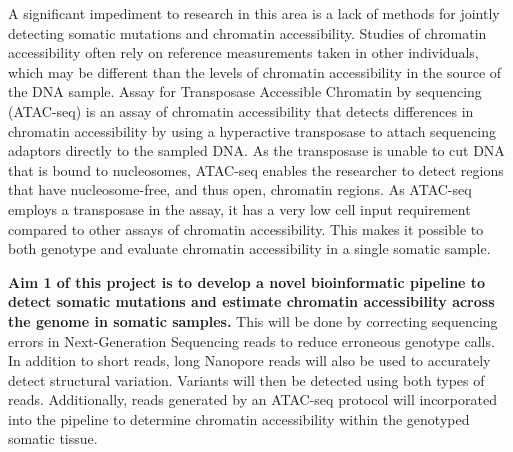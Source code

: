 A significant impediment to research in this area is a lack of methods for jointly detecting somatic mutations and chromatin accessibility. Studies of chromatin accessibility often rely on reference measurements taken in other individuals, which may be different than the levels of chromatin accessibility in the source of the DNA sample. Assay for Transposase Accessible Chromatin by sequencing (ATAC-seq) is an assay of chromatin accessibility that detects differences in chromatin accessibility by using a hyperactive transposase to attach sequencing adaptors directly to the sampled DNA. As the transposase is unable to cut DNA that is bound to nucleosomes, ATAC-seq enables the researcher to detect regions that have nucleosome-free, and thus open, chromatin regions.
As ATAC-seq employs a transposase in the assay, it has a very low cell input requirement compared to other assays of chromatin accessibility. This makes it possible to both genotype and evaluate chromatin accessibility in a single somatic sample.



\textbf{Aim 1 of this project is to develop a novel bioinformatic pipeline to detect somatic mutations and estimate chromatin accessibility across the genome in somatic samples.}
This will be done by correcting sequencing errors in Next-Generation Sequencing reads to reduce erroneous genotype calls. In addition to short reads, long Nanopore reads will also be used to accurately detect structural variation. Variants will then be detected using both types of reads.
Additionally, reads generated by an ATAC-seq protocol will incorporated into the pipeline to determine chromatin accessibility within the genotyped somatic tissue.

